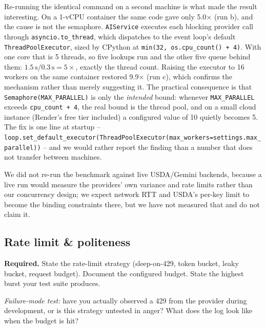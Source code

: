 \documentclass[11pt,a4paper]{article}
\newenvironment{deliverbox}{\begin{deliverboxshown}}{\end{deliverboxshown}}
\newenvironment{probebox}{\begin{probeboxshown}}{\end{probeboxshown}}
\newenvironment{deliverbox}{\setbox0\vbox\bgroup}{\egroup\ignorespacesafterend}
\newenvironment{probebox}{\setbox0\vbox\bgroup}{\egroup\ignorespacesafterend}
\begin{document}
\par\noindent
Re-running the identical command on a second machine is what made the
result interesting. On a 1-vCPU container the same code gave only
5.0$\times$ (run b), and the cause is not the semaphore. \texttt{AIService}
executes each blocking provider call through \texttt{asyncio.to\_thread},
which dispatches to the event loop's default \texttt{ThreadPoolExecutor},
sized by CPython at \texttt{min(32, os.cpu\_count() + 4)}. With one core
that is 5 threads, so five lookups run and the other five queue behind
them: $1.5\,\text{s}/0.3\,\text{s} = 5\times$, exactly the thread count.
Raising the executor to 16 workers on the same container restored
9.9$\times$ (run c), which confirms the mechanism rather than merely
suggesting it. The practical consequence is that
\texttt{Semaphore(MAX\_PARALLEL)} is only the \emph{intended} bound:
whenever \texttt{MAX\_PARALLEL} exceeds \texttt{cpu\_count + 4}, the real
bound is the thread pool, and on a small cloud instance (Render's free
tier included) a configured value of 10 quietly becomes 5. The fix is one
line at startup --
\texttt{loop.set\_default\_executor(ThreadPoolExecutor(max\_workers=settings.max\_parallel))}
-- and we would rather report the finding than a number that does not
transfer between machines.

\par\noindent
We did not re-run the benchmark against live USDA/Gemini backends, because
a live run would measure the providers' own variance and rate limits
rather than our concurrency design; we expect network RTT and USDA's
per-key limit to become the binding constraints there, but we have not
measured that and do not claim it.

\subsection{Rate limit \& politeness}

\begin{deliverbox}
\textbf{Required.} State the rate-limit strategy (sleep-on-429, token bucket, leaky bucket, request budget). Document the configured budget. State the highest burst your test suite produces.
\end{deliverbox}

\begin{probebox}
\textit{Failure-mode test:} have you actually observed a 429 from the provider during development, or is this strategy untested in anger? What does the log look like when the budget is hit?
\end{probebox}
\end{document}
